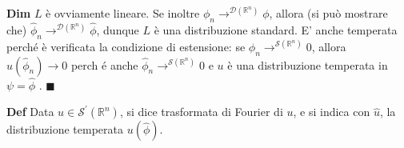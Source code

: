 \documentclass{article}
\begin{document}
\textbf{Dim} $L$ \`{e} ovviamente lineare. Se inoltre $\phi _{n}\rightarrow
^{\mathcal{D}\left( 
\mathbb{R}
^{n}\right) }\phi $, allora (si pu\`{o} mostrare che) $\hat{\phi}%
_{n}\rightarrow ^{\mathcal{D}\left( 
\mathbb{R}
^{n}\right) }\hat{\phi}$, dunque $L$ \`{e} una distribuzione standard. E'
anche temperata perch\'{e} \`{e} verificata la condizione di estensione: se $%
\phi _{n}\rightarrow ^{\mathcal{S}\left( 
\mathbb{R}
^{n}\right) }0$, allora $u\left( \hat{\phi}_{n}\right) \rightarrow 0$ perch%
\'{e} anche $\hat{\phi}_{n}\rightarrow ^{\mathcal{S}\left( 
\mathbb{R}
^{n}\right) }0$ e $u$ \`{e} una distribuzione temperata in $\psi =\hat{\phi}$%
. $\blacksquare $

\textbf{Def} Data $u\in \mathcal{S}^{\prime }\left( 
\mathbb{R}
^{n}\right) $, si dice trasformata di Fourier di $u$, e si indica con $\hat{u%
}$, la distribuzione temperata $u\left( \hat{\phi}\right) $.
\end{document}
